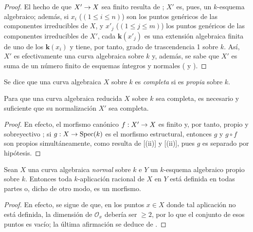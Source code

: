 \documentclass[oneside,10pt]{amsart}
\makeatletter
\renewcommand{\leq}{\leqslant}
\renewcommand{\geq}{\geqslant}
\newcommand{\ega@arrow}[2]{\mathchoice{#1}{#2}{#2}{#2}}
\renewcommand{\to}{\ega@arrow{\longrightarrow}{\rightarrow}}
\newcommand{\oldpage}[2][]{\marginnote{\normalfont\footnotesize\textbf{#1}~|~#2}\ignorespaces}
\let\EGAOriginalLabel\label
\renewcommand{\label}[1]{\phantomsection\EGAOriginalLabel{#1}}
\makeatother
\begin{document}
\begin{proof}
El hecho de que $X'\to X$ sea finito resulta de ;
$X'$ es, pues, un $k$-esquema algebraico;
además, si $x_i$ ($(1\leq i\leq n)$) son los puntos genéricos de las componentes irreducibles de $X$, y $x'_j$ ($(1\leq j\leq m)$) los puntos genéricos de las componentes irreducibles de $X'$, cada $\boldsymbol{k}(x'_j)$ es una extensión algebraica finita de uno de los $\boldsymbol{k}(x_i)$  y tiene, por tanto, grado de trascendencia 1 sobre $k$.
Así, $X'$ es efectivamente una curva algebraica sobre $k$ y, además, se sabe que $X'$ es suma de un número finito de esquemas íntegros y normales ( y ).
\end{proof}

\begin{env}[7.4.7]
\label{II.7.4.7-fr}
Se dice que una curva algebraica $X$ sobre $k$ es \emph{completa} si es \emph{propia} sobre $k$.
\end{env}

\begin{corollary}[7.4.8]
\label{II.7.4.8-fr}
Para que una curva algebraica reducida $X$ sobre $k$ sea completa, es necesario y suficiente que su normalización $X'$ sea completa.
\end{corollary}

\oldpage[II]{150}
\begin{proof}
En efecto, el morfismo canónico $f:X'\to X$ es finito  y, por tanto, propio  y sobreyectivo ;
si $g:X\to\operatorname{Spec}(k)$ es el morfismo estructural, entonces $g$ y $g\circ f$ son propios simultáneamente, como resulta de [(ii)] y [(ii)], pues $g$ es separado por hipótesis.
\end{proof}

\begin{proposition}[7.4.9]
\label{II.7.4.9-fr}
Sean $X$ una curva algebraica \emph{normal} sobre $k$ e $Y$ un $k$-esquema algebraico \textup{propio} sobre $k$.
Entonces toda $k$-aplicación racional de $X$ en $Y$ está definida en todas partes o, dicho de otro modo, es un morfismo.
\end{proposition}

\begin{proof}
En efecto, se sigue de  que, en los puntos $x\in X$ donde tal aplicación no está definida, la dimensión de $\mathcal{O}_x$ debería ser $\geq2$, por lo que el conjunto de esos puntos es vacío;
la última afirmación se deduce de .
\end{proof}
\end{document}
